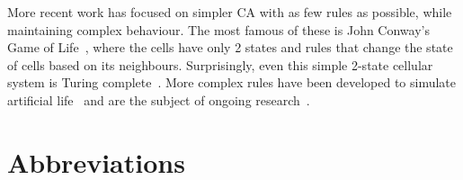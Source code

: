 \documentclass[11pt]{article}
\begin{document}
More recent work has focused on simpler \ac{CA} with as few rules as possible, while maintaining complex behaviour. The most famous of these is John Conway's Game of Life~\citep{gardner_mathematical_1970}, where the cells have only 2 states and rules that change the state of cells based on its neighbours. Surprisingly, even this simple 2-state cellular system is Turing complete~\citep{rendell_fully_2013}. More complex rules have been developed to simulate artificial life~\citep{hong_kong_lenia_2019} and are the subject of ongoing research~\citep{chan_lenia_2020}.



\section{Abbreviations}
\begin{acronym}[GCD]
\end{acronym}
\end{document}
